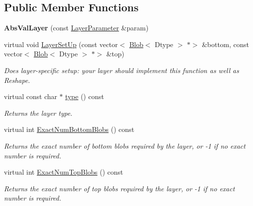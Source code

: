 \subsection*{Public Member Functions}
\begin{DoxyCompactItemize}
\item 
\mbox{\label{classcaffe_1_1_abs_val_layer_a513c13552694e5860b85986b94793eb0}} 
{\bfseries Abs\+Val\+Layer} (const \mbox{\hyperlink{classcaffe_1_1_layer_parameter}{Layer\+Parameter}} \&param)
\item 
virtual void \mbox{\hyperlink{classcaffe_1_1_abs_val_layer_a4ef25e7d0cbe06404948d7e763bf0f84}{Layer\+Set\+Up}} (const vector$<$ \mbox{\hyperlink{classcaffe_1_1_blob}{Blob}}$<$ Dtype $>$ $\ast$$>$ \&bottom, const vector$<$ \mbox{\hyperlink{classcaffe_1_1_blob}{Blob}}$<$ Dtype $>$ $\ast$$>$ \&top)
\begin{DoxyCompactList}\small\item\em Does layer-\/specific setup\+: your layer should implement this function as well as Reshape. \end{DoxyCompactList}\item 
\mbox{\label{classcaffe_1_1_abs_val_layer_aae782c69f757eacf4cec30131726e29d}} 
virtual const char $\ast$ \mbox{\hyperlink{classcaffe_1_1_abs_val_layer_aae782c69f757eacf4cec30131726e29d}{type}} () const
\begin{DoxyCompactList}\small\item\em Returns the layer type. \end{DoxyCompactList}\item 
virtual int \mbox{\hyperlink{classcaffe_1_1_abs_val_layer_acac806dbc6d3fa3dd7daae00caabd731}{Exact\+Num\+Bottom\+Blobs}} () const
\begin{DoxyCompactList}\small\item\em Returns the exact number of bottom blobs required by the layer, or -\/1 if no exact number is required. \end{DoxyCompactList}\item 
virtual int \mbox{\hyperlink{classcaffe_1_1_abs_val_layer_aaf18bf4b77994475e8b55e5cefaa654a}{Exact\+Num\+Top\+Blobs}} () const
\begin{DoxyCompactList}\small\item\em Returns the exact number of top blobs required by the layer, or -\/1 if no exact number is required. \end{DoxyCompactList}\item 

\end{DoxyCompactItemize}
